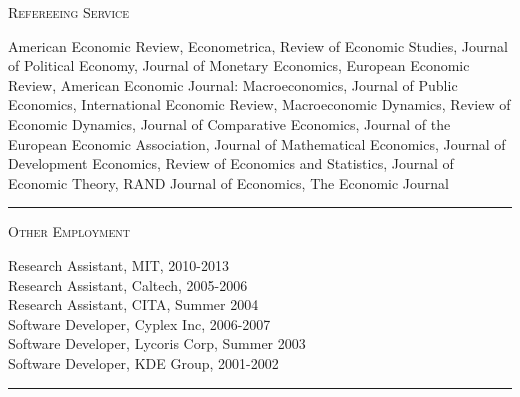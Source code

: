 \documentclass{article}
\begin{document}
\parbox{\textwidth}{
\parbox[t]{0.28\textwidth}{ \raggedright \noindent \textsc{ Refereeing Service } }
\parbox[t]{0.72\textwidth}{ \raggedright

American Economic Review, Econometrica, Review of Economic Studies, Journal of Political Economy, Journal of Monetary Economics, European Economic Review, American Economic Journal: Macroeconomics, Journal of Public Economics, International Economic Review, Macroeconomic Dynamics, Review of Economic Dynamics, Journal of Comparative Economics, Journal of the European Economic Association, Journal of Mathematical Economics, Journal of Development Economics, Review of Economics and Statistics, Journal of Economic Theory, RAND Journal of Economics, The Economic Journal
\vspace{0.27cm}

}
\textcolor{light-gray}{\hrule}
}
\vspace{0.3cm}

\parbox{\textwidth}{
\parbox[t]{0.28\textwidth}{ \raggedright \noindent \textsc{ Other Employment } }
\parbox[t]{0.72\textwidth}{ \raggedright

Research Assistant, MIT, 2010-2013 \\
Research Assistant, Caltech, 2005-2006 \\
Research Assistant, CITA, Summer 2004 \\
Software Developer, Cyplex Inc, 2006-2007 \\
Software Developer, Lycoris Corp, Summer 2003 \\
Software Developer, KDE Group, 2001-2002
\vspace{0.27cm}

}
\textcolor{light-gray}{\hrule}
}
\vspace{0.3cm}
\end{document}
